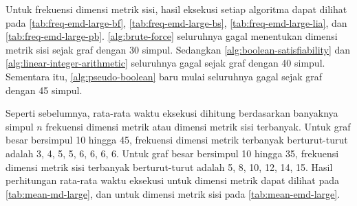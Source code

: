 \documentclass[10pt,twocolumn]{article}
\newcommand{\minipagewidth}{\linewidth}
\begin{document}
Untuk frekuensi dimensi metrik sisi, hasil eksekusi setiap algoritma dapat dilihat pada \autoref{tab:freq-emd-large-bf}, \autoref{tab:freq-emd-large-bs}, \autoref{tab:freq-emd-large-lia}, dan \autoref{tab:freq-emd-large-pb}. \autoref{alg:brute-force} seluruhnya gagal menentukan dimensi metrik sisi sejak graf dengan 30 simpul. Sedangkan \autoref{alg:boolean-satisfiability} dan \autoref{alg:linear-integer-arithmetic} seluruhnya gagal sejak graf dengan 40 simpul. Sementara itu, \autoref{alg:pseudo-boolean} baru mulai seluruhnya gagal sejak graf dengan 45 simpul.

\begin{center}
	\renewcommand{\minipagewidth}{0.9\linewidth}

	

	\vspace{1em}

	

	\vspace{1em}

	

	\vspace{1em}

	

	\vspace{1em}

	

	\vspace{1em}

	

	\vspace{1em}

	

	\vspace{1em}

	

	\vspace{1em}

	\renewcommand{\minipagewidth}{\linewidth}

	
\end{center}

Seperti sebelumnya, rata-rata waktu eksekusi dihitung berdasarkan banyaknya simpul \(n\) frekuensi dimensi metrik atau dimensi metrik sisi terbanyak. Untuk graf besar bersimpul 10 hingga 45, frekuensi dimensi metrik terbanyak berturut-turut adalah 3, 4, 5, 5, 6, 6, 6, 6. Untuk graf besar bersimpul 10 hingga 35, frekuensi dimensi metrik sisi terbanyak berturut-turut adalah 5, 8, 10, 12, 14, 15. Hasil perhitungan rata-rata waktu eksekusi untuk dimensi metrik dapat dilihat pada \autoref{tab:mean-md-large}, dan untuk dimensi metrik sisi pada \autoref{tab:mean-emd-large}.
\end{document}
